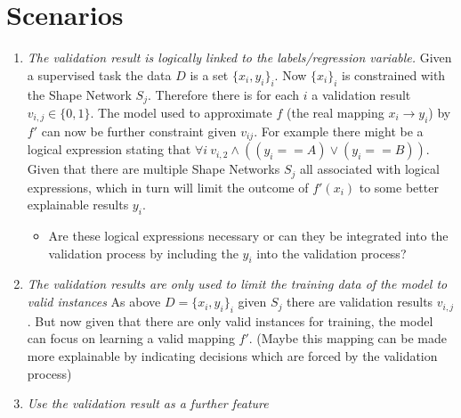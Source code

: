 \documentclass[../../thesis]{subfiles}
\begin{document}
\section{Scenarios}
\begin{enumerate}
    \item \emph{The validation result is logically linked to the labels/regression variable.} Given a supervised task the data $D$ is a set $\{x_i,y_i\}_i$.
    Now $\{x_i\}_i$ is constrained with the Shape Network $S_j$. Therefore there is for each $i$ a validation result $v_{i,j} \in \{0,1\}$. The model used to approximate $f$ (the real mapping $x_i \to y_i$) by $f'$ can now be further constraint given $v_{ij}$. For example there might be a logical expression stating that $\forall i ~ v_{i,2} \land ((y_i == A) \lor (y_i == B))$. 
    Given that there are multiple Shape Networks $S_j$ all associated with logical expressions, which in turn will limit the outcome of $f'(x_i)$ to some better explainable results $y_i$. 
    \begin{itemize}
        \item Are these logical expressions necessary or can they be integrated into the validation process by including the $y_i$ into the validation process?
    \end{itemize}
    
    \item \emph{The validation results are only used to limit the training data of the model to valid instances} As above $D = \{x_i, y_i\}_i$ given $S_j$ there are validation results $v_{i,j}$. But now given that there are only valid instances for training, the model can focus on learning a valid mapping $f'$. (Maybe this mapping can be made more explainable by indicating decisions which are forced by the validation process)
    
    \item \emph{Use the validation result as a further feature}
\end{enumerate}
\end{document}
